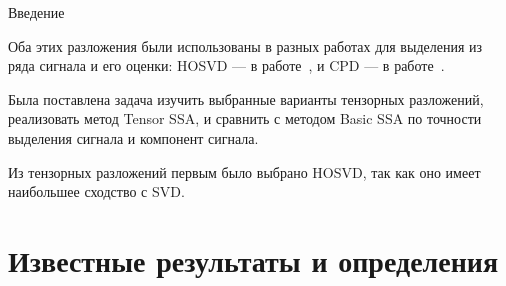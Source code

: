 \documentclass[ucs, notheorems, handout]{beamer}
\begin{document}
\begin{frame}{Введение}
{            Оба этих разложения были использованы в разных работах для выделения из ряда сигнала и его оценки:
            HOSVD --- в работе~\cite{tssa-hosvd}, и CPD --- в работе~\cite{tssa-cpd}.

            Была поставлена задача изучить выбранные варианты тензорных разложений, реализовать метод Tensor SSA,
            и сравнить с методом Basic SSA по точности выделения сигнала и компонент сигнала.

            Из тензорных разложений первым было выбрано HOSVD, так как оно имеет наибольшее сходство с SVD\@.
        }
    \end{frame}


    \section{Известные результаты и определения}\label{sec:known}
\end{document}
